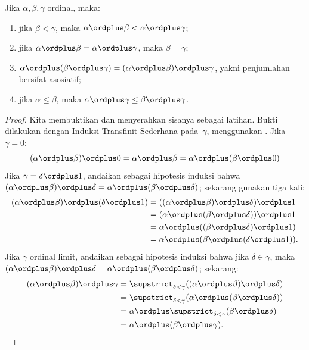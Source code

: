 \documentclass[../../../include/open-logic-section]{subfiles}
\begin{document}
\begin{lem}
Jika $\alpha,\beta,\gamma$ ordinal, maka:
\begin{enumerate}
	\item{} jika $\beta<\gamma$, maka
	$\alpha\ordplus\beta<\alpha\ordplus\gamma$;
	\item{} jika
	$\alpha\ordplus\beta=\alpha\ordplus\gamma$, maka $\beta=\gamma$;
	\item{}
	$\alpha\ordplus(\beta\ordplus\gamma)
	=(\alpha\ordplus\beta)\ordplus\gamma$, yakni penjumlahan bersifat
	asosiatif;
	\item{} jika $\alpha\leq\beta$, maka
	$\alpha\ordplus\gamma\leq\beta\ordplus\gamma$.
\end{enumerate}
\end{lem}

\begin{proof}
Kita membuktikan  dan menyerahkan sisanya sebagai
latihan. Bukti dilakukan dengan Induksi Transfinit Sederhana pada~$\gamma$,
menggunakan . Jika $\gamma=0$:
\[
(\alpha \ordplus  \beta) \ordplus  0 = \alpha \ordplus  \beta  = \alpha \ordplus  (\beta \ordplus  0)
\]
Jika $\gamma=\delta\ordplus1$, andaikan sebagai hipotesis induksi bahwa
$(\alpha\ordplus\beta)\ordplus\delta
=\alpha\ordplus(\beta\ordplus\delta)$; sekarang gunakan
 tiga kali:
\begin{align*}
	(\alpha \ordplus  \beta) \ordplus  (\delta \ordplus  1) & = ((\alpha \ordplus  \beta) \ordplus  \delta)\ordplus 1\\
	& = (\alpha \ordplus  (\beta \ordplus  \delta)) \ordplus  1\\
	& = \alpha \ordplus  ((\beta \ordplus  \delta)\ordplus 1)\\
	& = \alpha \ordplus  (\beta \ordplus  (\delta\ordplus 1)).
\end{align*}
Jika $\gamma$ ordinal limit, andaikan sebagai hipotesis induksi bahwa jika
$\delta\in\gamma$, maka
$(\alpha\ordplus\beta)\ordplus\delta
=\alpha\ordplus(\beta\ordplus\delta)$; sekarang:
\begin{align*}
	(\alpha \ordplus  \beta) \ordplus  \gamma & = \supstrict_{\delta < \gamma}((\alpha \ordplus  \beta) \ordplus  \delta) \\
	&= \supstrict_{\delta < \gamma}(\alpha \ordplus  (\beta \ordplus  \delta))\\
	&= \alpha \ordplus  \supstrict_{\delta < \gamma}(\beta \ordplus  \delta)\\
	& = \alpha \ordplus  (\beta \ordplus  \gamma).
\end{align*}
\end{proof}
\end{document}
